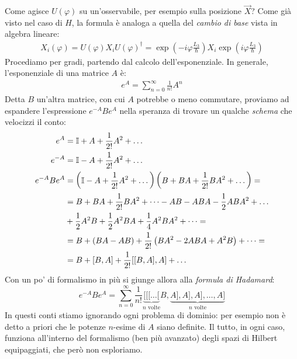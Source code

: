 \documentclass[../../FisicaTeorica.tex]{subfiles}
\begin{document}
Come agisce $U(\varphi)$ su un'osservabile, per esempio sulla posizione $\vec{X}$? Come già visto nel caso di $H$, la formula è analoga a quella del \textit{cambio di base} vista in algebra lineare:
\begin{align*}
X_i(\varphi) =U(\varphi) X_i U(\varphi)^\dag = \exp \left( -i\varphi\frac{L_3}{\hbar}\right) X_i \exp\left(i\varphi\frac{L_3}{\hbar}\right)
\end{align*}
Procediamo per gradi, partendo dal calcolo dell'esponenziale. In generale, l'esponenziale di una matrice $A$ è:
\begin{align*}
e^A = \sum_{n=0}^{\infty}\frac{1}{n!}A^n
\end{align*}
Detta $B$ un'altra matrice, con cui $A$ potrebbe o meno commutare, proviamo ad espandere l'espressione $e^{-A}B e^A$ nella speranza di trovare un qualche \textit{schema} che velocizzi il conto:
\begin{align*}
e^A &= \mathbb{I} + A + \frac{1}{2!} A^2 + \dots\\
e^{-A} &= \mathbb{I} - A + \frac{1}{2!}A^2 + \dots\\
e^{-A}B e^A &= \left(
\mathbb{I} - A + \frac{1}{2!}A^2 + \dots
\right)\left(B + BA + \frac{1}{2!}BA^2 + \dots \right) =\\
&=B+BA + \frac{1}{2!}BA^2 + \dots - AB -ABA -\frac{1}{2}ABA^2 + \dots \\
&+ \frac{1}{2} A^2 B + \frac{1}{2}A^2BA + \frac{1}{4}A^2BA^2 + \dots =\\
&=B + \left(BA-AB\right) +\frac{1}{2!}\left(BA^2 - 2ABA +A^2B\right) +\dots =\\
&=B + [B,A] +\frac{1}{2!} [[B,A],A] + \dots
\end{align*}
Con un po' di formalismo in più si giunge allora alla \textit{formula di Hadamard}:
\[
e^{-A} B e^A = \sum_{n=0}^\infty \frac{1}{n!} \underbrace{[[[\dots [}_{n \text{ volte}}B,\underbrace{A],A],A],\dots,A]}_{n \text{ volte}}
\]
In questi conti stiamo ignorando ogni problema di dominio: per esempio non è detto a priori che le potenze $n$-esime di $A$ siano definite. Il tutto, in ogni caso, funziona all'interno del formalismo (ben più avanzato) degli spazi di Hilbert equipaggiati, che però non esploriamo.\\
\end{document}
